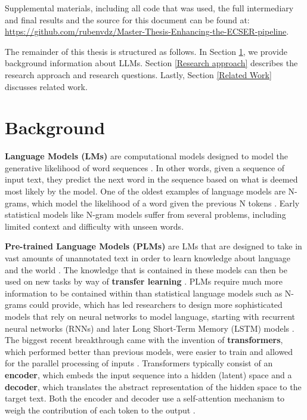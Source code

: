 \documentclass[a4paper]{article}
\begin{document}
Supplemental materials, including all code that was used, the full intermediary and final results and the source for this document can be found at:\\ \url{https://github.com/rubenvdz/Master-Thesis-Enhancing-the-ECSER-pipeline}.

The remainder of this thesis is structured as follows. In Section \ref{Background}, we provide background information about LLMs. Section \ref{Research approach} describes the research approach and research questions. Lastly, Section \ref{Related Work} discusses related work.

\section{Background}\label{Background}
\textbf{Language Models (LMs)} are computational models designed to model the generative likelihood of word sequences \cite{zhao2025}. In other words, given a sequence of input text, they predict the next word in the sequence based on what is deemed most likely by the model. One of the oldest examples of language models are N-grams, which model the likelihood of a word given the previous N tokens \cite{shannon1948}. Early statistical models like N-gram models suffer from several problems, including limited context and difficulty with unseen words.

\textbf{Pre-trained Language Models (PLMs)} are LMs that are designed to take in vast amounts of unannotated text in order to learn knowledge about language and the world \cite{jurafsky2025}. The knowledge that is contained in these models can then be used on new tasks by way of \textbf{transfer learning} \cite{wang2023plm}. PLMs require much more information to be contained within than statistical language models such as N-grams could provide, which has led researchers to design more sophisticated models that rely on neural networks to model language, starting with recurrent neural networks (RNNs) and later Long Short-Term Memory (LSTM) models \cite{mikolov2012rnn,hochreiter1997lstm}. The biggest recent breakthrough came with the invention of \textbf{transformers}, which performed better than previous models, were easier to train and allowed for the parallel processing of inputs \cite{Vaswani2017transformer}. Transformers typically consist of an \textbf{encoder}, which embeds the input sequence into a hidden (latent) space and a \textbf{decoder}, which translates the abstract representation of the hidden space to the target text. Both the encoder and decoder use a self-attention mechanism to weigh the contribution of each token to the output \cite{Vaswani2017transformer,bahdanau2016attention}.
\end{document}
